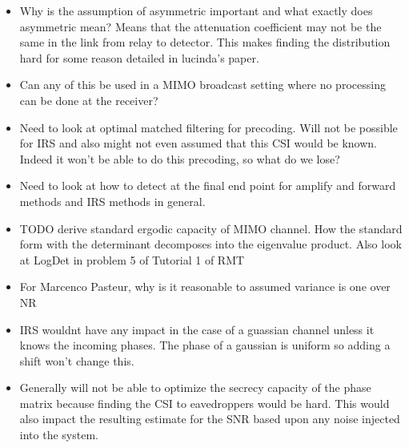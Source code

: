 \documentclass[12pt,a4paper]{report}
\begin{document}
\begin{itemize}
\item Why is the assumption of asymmetric important and what exactly does asymmetric mean? Means that the attenuation coefficient may not be the same in the link from relay to detector. This makes finding the distribution hard for some reason detailed in lucinda's paper.
\item Can any of this be used in a MIMO broadcast setting where no processing can be done at the receiver?
\item Need to look at optimal matched filtering for precoding. Will not be possible for IRS and also might not even assumed that this
	CSI would be known. Indeed it won't be able to do this precoding, so what do we lose?
\item Need to look at how to detect at the final end point for amplify and forward methods and IRS methods in general.
\item TODO derive standard ergodic capacity of MIMO channel. How the standard form with the determinant decomposes into the eigenvalue product. Also look at LogDet in problem 5 of Tutorial 1 of RMT
\item For Marcenco Pasteur, why is it reasonable to assumed variance is one over NR
\item IRS wouldnt have any impact in the case of a guassian channel unless it knows the incoming phases. The phase of a gaussian is uniform so adding a shift won't change this. 
\item Generally will not be able to optimize the secrecy capacity of the phase matrix because finding the CSI to eavedroppers would be hard. This would also impact the resulting estimate for the SNR based upon any noise injected into the system.

\end{itemize}
\end{document}
